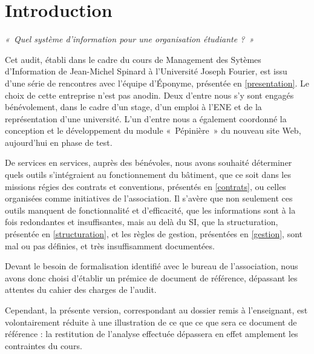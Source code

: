 \section*{Introduction}

\textit{«~Quel système d'information pour une organisation étudiante ?~»}

Cet audit, établi dans le cadre du cours de Management des Sytèmes
d'Information de Jean-Michel Spinard à l'Université Joseph Fourier,
est issu d'une série
de rencontres avec l'équipe d'Éponyme, présentée en \ref{presentation}.
Le choix de cette entreprise n'est pas anodin. Deux d'entre nous s'y sont
engagés bénévolement, dans le cadre d'un stage, d'un emploi à l'ENE et de la
représentation d'une université. L'un d'entre nous a également coordonné la
conception et le développement du module «~Pépinière~» du nouveau site Web,
aujourd'hui en phase de test.

De services en services, auprès des bénévoles, nous
avons souhaité déterminer quels outils s'intégraient au fonctionnement du
bâtiment, que ce soit dans les missions régies des contrats et conventions,
présentés en \ref{contrats}, ou celles organisées comme initiatives de l'association.
Il s'avère que non seulement ces outils manquent de fonctionnalité et
d'efficacité, que les informations sont à la fois redondantes et insuffisantes,
mais au delà du SI, que la structuration, présentée en \ref{structuration}, et les
règles de gestion, présentées en \ref{gestion}, sont mal ou pas définies,
et très insuffisamment documentées.

Devant le besoin de formalisation identifié avec le bureau de l'association,
nous avons donc choisi d'établir un prémice de document de référence,
dépassant les attentes du cahier des charges de l'audit.

Cependant, la présente version, correspondant au dossier remis à l'enseignant,
est volontairement réduite à une illustration de ce que ce que sera
ce document de référence : la restitution de l'analyse effectuée dépassera
en effet amplement les contraintes du cours.